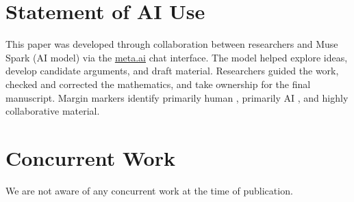 \documentclass[11pt]{article}
\theoremstyle{plain}
\theoremstyle{definition}
\theoremstyle{remark}
\begin{document}
\section*{Statement of AI Use}

\begin{humanblock}
This paper was developed through collaboration between researchers and Muse Spark (AI model) via the \href{http://meta.ai}{meta.ai} chat interface. The model helped explore ideas, develop candidate arguments, and draft material. Researchers guided the work, checked and corrected the mathematics, and take ownership for the final manuscript. Margin markers identify primarily human \!\!\HumanLabel\!\!, primarily AI \!\!\AILabel\!\!, and highly collaborative\HumanAILabel\!\! material.
\end{humanblock}

\section*{Concurrent Work}
\begin{humanblock}
We are not aware of any concurrent work at the time of publication.
\end{humanblock}
\end{document}
